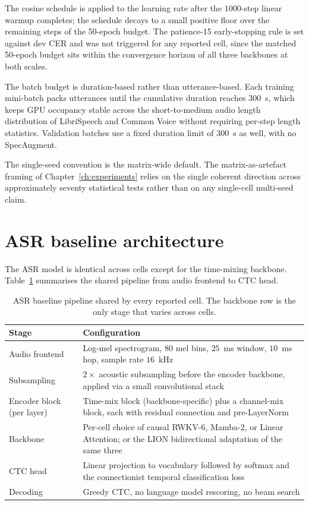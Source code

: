 The cosine schedule is applied to the learning rate after the
$1000$-step linear warmup completes; the schedule decays to a small
positive floor over the remaining steps of the 50-epoch budget. The
patience-15 early-stopping rule is set against dev CER and was not
triggered for any reported cell, since the matched 50-epoch budget
sits within the convergence horizon of all three backbones at both
scales.

The batch budget is duration-based rather than utterance-based.
Each training mini-batch packs utterances until the cumulative
duration reaches $300$~s, which keeps GPU occupancy stable across
the short-to-medium audio length distribution of LibriSpeech and
Common Voice without requiring per-step length statistics.
Validation batches use a fixed duration limit of $300$~s as well,
with no SpecAugment.

The single-seed convention is the matrix-wide default. The
matrix-as-artefact framing of Chapter~\ref{ch:experiments} relies
on the single coherent direction across approximately seventy
statistical tests rather than on any single-cell multi-seed claim.

\section{ASR baseline architecture}\label{app:setup:arch}

The ASR model is identical across cells except for the time-mixing
backbone. Table~\ref{tab:setup:arch} summarises the shared pipeline
from audio frontend to CTC head.

\begin{table}[!htbp]
\centering
\small
\caption[ASR baseline architecture]{ASR baseline pipeline shared by
every reported cell. The backbone row is the only stage that varies
across cells.}
\label{tab:setup:arch}
\setlength{\tabcolsep}{6pt}
\renewcommand{\arraystretch}{1.15}
\begin{tabularx}{\linewidth}{@{}p{3.5cm} X@{}}
\toprule
\textbf{Stage} & \textbf{Configuration} \\
\midrule
Audio frontend & Log-mel spectrogram, $80$ mel bins, $25$~ms window,
$10$~ms hop, sample rate $16$~kHz \\
\addlinespace
Subsampling & $2\times$ acoustic subsampling before the encoder
backbone, applied via a small convolutional stack \\
\addlinespace
Encoder block (per layer) & Time-mix block (backbone-specific) plus a
channel-mix block, each with residual connection and pre-LayerNorm \\
\addlinespace
Backbone & Per-cell choice of causal RWKV-6, Mamba-2, or Linear
Attention; or the LION bidirectional adaptation of the same three \\
\addlinespace
CTC head & Linear projection to vocabulary followed by softmax and
the connectionist temporal classification
loss~\cite{graves2006ctc} \\
\addlinespace
Decoding & Greedy CTC, no language model rescoring, no beam search \\
\bottomrule
\end{tabularx}
\end{table}


